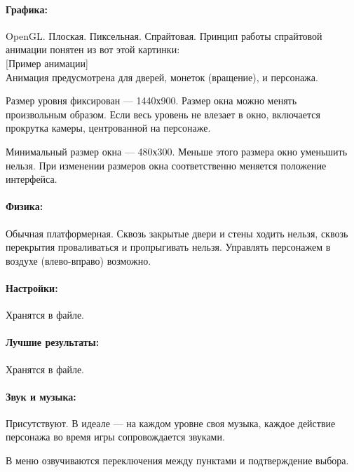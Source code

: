 \documentclass[12pt,a4paper]{article}
\begin{document}
\paragraph{Графика:}
OpenGL. Плоская. Пиксельная. Спрайтовая. Принцип работы спрайтовой анимации понятен из вот этой картинки:\\

{\color{blue}[Пример анимации]}\\

Анимация предусмотрена для дверей, монеток (вращение), и персонажа.

Размер уровня фиксирован --- 1440х900. Размер окна можно менять произвольным образом. Если весь уровень не влезает в окно, включается прокрутка камеры, центрованной на персонаже.

Минимальный размер окна --- 480х300. Меньше этого размера окно уменьшить нельзя. При изменении размеров окна соответственно меняется положение интерфейса.

\paragraph{Физика:}
Обычная платформерная. Сквозь закрытые двери и стены ходить нельзя, сквозь перекрытия проваливаться и пропрыгивать нельзя. Управлять персонажем в воздухе (влево-вправо) возможно.

\paragraph{Настройки:}
Хранятся в файле.

\paragraph{Лучшие результаты:}
Хранятся в файле.

\paragraph{Звук и музыка:}
Присутствуют. В идеале --- на каждом уровне своя музыка, каждое действие персонажа во время игры сопровождается звуками.

В меню озвучиваются переключения между пунктами и подтверждение выбора.
\end{document}
